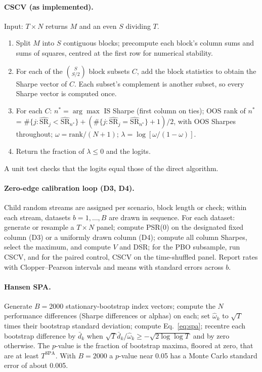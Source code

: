 \documentclass[11pt,a4paper]{article}
\newcommand{\hSR}{\widehat{\mathrm{SR}}}
\begin{document}
\paragraph{CSCV (as implemented).} Input: $T\times N$ returns $M$ and an even $S$ dividing $T$.
\begin{enumerate}
\item Split $M$ into $S$ contiguous blocks; precompute each block's column sums and sums of squares, centred at the first row for numerical stability.
\item For each of the $\binom{S}{S/2}$ block subsets $C$, add the block statistics to obtain the Sharpe vector of $C$. Each subset's complement is another subset, so every Sharpe vector is computed once.
\item For each $C$: $n^\ast=\arg\max$ IS Sharpe (first column on ties); OOS rank of $n^\ast$ = $\#\{j:\hSR_j<\hSR_{n^\ast}\}+(\#\{j:\hSR_j=\hSR_{n^\ast}\}+1)/2$, with OOS Sharpes throughout; $\omega=\text{rank}/(N+1)$; $\lambda=\log[\omega/(1-\omega)]$.
\item Return the fraction of $\lambda\le0$ and the logits.
\end{enumerate}
A unit test checks that the logits equal those of the direct algorithm.

\paragraph{Zero-edge calibration loop (D3, D4).} Child random streams are assigned per scenario, block length or check; within each stream, datasets $b=1,\dots,B$ are drawn in sequence. For each dataset: generate or resample a $T\times N$ panel; compute PSR(0) on the designated fixed column (D3) or a uniformly drawn column (D4); compute all column Sharpes, select the maximum, and compute $V$ and DSR; for the PBO subsample, run CSCV, and for the paired control, CSCV on the time-shuffled panel. Report rates with Clopper--Pearson intervals and means with standard errors across $b$.

\paragraph{Hansen SPA.} Generate $B=2000$ stationary-bootstrap index vectors; compute the $N$ performance differences (Sharpe differences or alphas) on each; set $\hat\omega_k$ to $\sqrt T$ times their bootstrap standard deviation; compute Eq.~\eqref{eq:spa}; recentre each bootstrap difference by $\bar d_k$ when $\sqrt T\bar d_k/\hat\omega_k\ge-\sqrt{2\log\log T}$ and by zero otherwise. The $p$-value is the fraction of bootstrap maxima, floored at zero, that are at least $T^{\mathrm{SPA}}$. With $B=2000$ a $p$-value near 0.05 has a Monte Carlo standard error of about 0.005.
\end{document}
